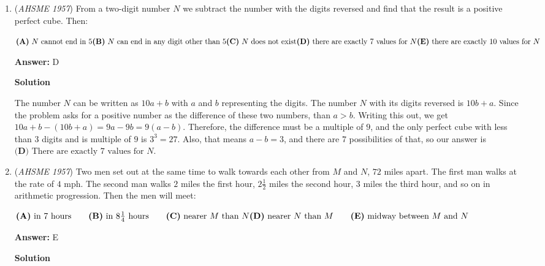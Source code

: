 \begin{enumerate}
 


	\item (\textit{AHSME 1957}) From a two-digit number $N$ we subtract the number with the digits reversed and find that the result is a positive perfect cube. Then: 


 $\textbf{(A)}\ {N}\text{ cannot end in 5}\qquad\\  \textbf{(B)}\ {N}\text{ can end in any digit other than 5}\qquad \\  \textbf{(C)}\ {N}\text{ does not exist}\qquad\\  \textbf{(D)}\ \text{there are exactly 7 values for }{N}\qquad\\  \textbf{(E)}\ \text{there are exactly 10 values for }{N}$

 \textbf{Answer: }D



\textbf{Solution}

The number $N$ can be written as $10a+b$ with $a$ and $b$ representing the digits. The number $N$ with its digits reversed is $10b+a$. Since the problem asks for a positive number as the difference of these two numbers, than $a>b$. Writing this out, we get $10a+b-(10b+a)=9a-9b=9(a-b)$. Therefore, the difference must be a multiple of $9$, and the only perfect cube with less than $3$ digits and is multiple of $9$ is $3^3=27$. Also, that means $a-b=3$, and there are $7$ possibilities of that, so our answer is $\boxed{\textbf{(D) } \text{There are exactly } 7 \text{ values for } N}$.

 


	\item (\textit{AHSME 1957}) Two men set out at the same time to walk towards each other from $M$ and $N$, $72$ miles apart. 
The first man walks at the rate of $4$ mph. The second man walks $2$ miles the first hour, $2\frac {1}{2}$ 
miles the second hour, $3$ miles the third hour, and so on in arithmetic progression. Then the men will meet: 


 $\textbf{(A)}\ \text{in 7 hours} \qquad  \textbf{(B)}\ \text{in }{8\frac {1}{4}}\text{ hours}\qquad  \textbf{(C)}\ \text{nearer }{M}\text{ than }{N}\qquad\\  \textbf{(D)}\ \text{nearer }{N}\text{ than }{M}\qquad \textbf{(E)}\ \text{midway between }{M}\text{ and }{N}$

 \textbf{Answer: }E



\textbf{Solution}


\end{enumerate}
